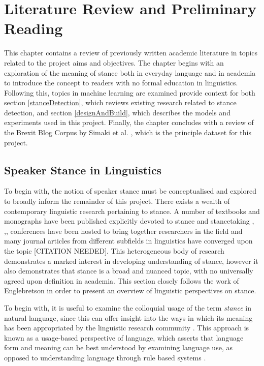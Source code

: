 \documentclass[Dissertation.tex]{subfiles}
\begin{document}
\chapter{Literature Review and Preliminary Reading}
This chapter contains a review of previously written academic literature in topics related to the project aims and objectives. The chapter begins with an exploration of the meaning of stance both in everyday language and in academia to introduce the concept to readers with no formal education in linguistics.  Following this, topics in machine learning are examined provide context for both section \ref{stanceDetection}, which reviews existing research related to stance detection, and section \ref{designAndBuild}, which describes the models and experiments used in this project. Finally, the chapter concludes with a review of the Brexit Blog Corpus by Simaki et al. \cite{simakiAnnotatingSpeakerStance2017}, which is the principle dataset for this project.
 
\section{Speaker Stance in Linguistics}
To begin with, the notion of speaker stance must be conceptualised and explored to broadly inform the remainder of this project. There exists a wealth of contemporary linguistic research pertaining to stance. A number of textbooks and monographs have been published explicitly devoted to stance and stancetaking
\cite{hunstonEvaluationTextAuthorial2000}, \cite{englebretsonStancetakingDiscourseSubjectivity2007},\cite{karkkainenEpistemicStanceEnglish2003}, 
%
conferences have been hosted to bring together researchers in the field
%
%
and  many journal articles from different subfields in linguistics have converged upon the topic [CITATION NEEDED]. This heterogeneous body of research demonstrates a marked interest in developing understanding of stance, however it also demonstrates that stance is a broad and nuanced topic, with no universally agreed upon definition in academia. This section closely follows the work of Englebretson \cite{englebretsonStancetakingDiscourseSubjectivity2007} in order to present an overview of linguistic perspectives on stance.

To begin with, it is useful to examine the colloquial usage of the term \textit{stance} in natural language, since this can offer insight into the ways in which its meaning has been appropriated by the linguistic research community \cite{englebretsonStancetakingDiscourseSubjectivity2007}. This approach is known as a usage-based perspective of language, which asserts that language form and meaning can be best understood by examining language use, as opposed to understanding language through rule based systems \cite{barlowUsagebasedModelsLanguage2000}. 
\end{document}
